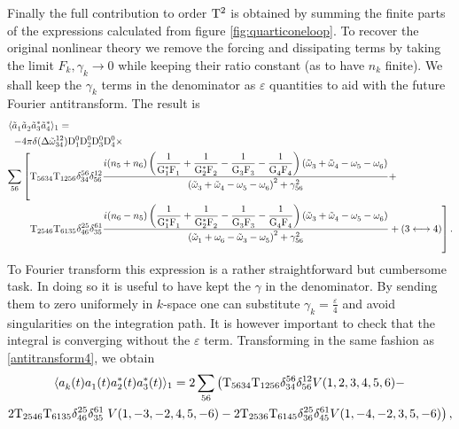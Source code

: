 Finally the full contribution to order $\mathrm{T}^2$ is obtained by summing the finite parts of the expressions calculated from figure \ref{fig:quarticoneloop}.
To recover the original nonlinear theory we remove the forcing and dissipating terms by taking the limit $F_k, \gamma_k \rightarrow 0$ while keeping their ratio constant
(as to have $n_k$ finite). We shall keep the $\gamma_k$ terms in the denominator as $\varepsilon$ quantities to aid with the future Fourier antitransform. The result is 
\begin{equation}
    \begin{aligned}
    \langle\tilde{a}_1^{} &\tilde{a}_2^{}\tilde{a}_3^{*}\tilde{a}_4^{*} \rangle_1 = 
    \\
    -&4\pi \delta(\Delta{\tilde{\omega}}^{12}_{34})\mathrm{D}^0_1\mathrm{D}^0_2\mathrm{D}^0_3\mathrm{D}^0_4 \times
    \\
      \sum_{56}&\left[\mathrm{T}_{5634}\mathrm{T}_{1256}\delta^{56}_{34}\delta^{12}_{56}
    \frac{i(n_5 + n_6)\left(\dfrac{1}{\mathrm{G}_1^*\mathrm{F}_1^{}}+\dfrac{1}{\mathrm{G}_2^*\mathrm{F}_2^{}}-\dfrac{1}{\mathrm{G}_3^{}\mathrm{F}_3^{}}
    -\dfrac{1}{\mathrm{G}_4^{}\mathrm{F}_4^{}}\right)\left( \tilde{\omega}^{}_3 + \tilde{\omega}^{}_4 - \omega^{}_5 - \omega^{}_6\right)}{\left( \tilde{\omega}^{}_3 + \tilde{\omega}^{}_4 - \omega^{}_5 - \omega^{}_6\right)^2 + \gamma^2_{56}}
    +  \right.
    \\
    &\hspace{2mm}\left. \mathrm{T}_{2546}\mathrm{T}_{6135}\delta^{25}_{46}\delta^{61}_{35}
    \frac{i(n_6 - n_5)\left(\dfrac{1}{\mathrm{G}_1^*\mathrm{F}_1^{}}+\dfrac{1}{\mathrm{G}_2^*\mathrm{F}_2^{}}-\dfrac{1}{\mathrm{G}_3^{}\mathrm{F}_3^{}}
    -\dfrac{1}{\mathrm{G}_4^{}\mathrm{F}_4^{}}\right)\left( \tilde{\omega}^{}_3 + \tilde{\omega}^{}_4 - \omega^{}_5 - \omega^{}_6\right)}{\left( \tilde{\omega}^{}_1 + \omega^{}_6 - \tilde{\omega}^{}_3 - \omega^{}_5\right)^2 + \gamma^2_{56}}
    + \left( 3 \longleftrightarrow 4 \right) \right].
    \end{aligned}
    \label{transformedfourpoint}
\end{equation}
To Fourier transform this expression is a rather straightforward but cumbersome task. In doing so it is useful to have kept the $\gamma$ in the denominator. 
By sending them to zero uniformely in $k$-space one can substitute $\gamma_k= \frac{\varepsilon}{4}$ and avoid singularities on the integration path. It is however important 
to check that the integral is converging without the $\varepsilon$ term. Transforming in the same fashion as \eqref{antitransform4}, we obtain 
\begin{multline}
    \langle a_k^{}(t) a_1^{}(t) a_2^*(t)a_3^*(t) \rangle_{1} = 2\sum_{56} \left( \mathrm{T}_{5634}\mathrm{T}_{1256}\delta^{56}_{34}\delta^{12}_{56}  V(1,2,3,4,5,6) - \right.\\
    2\mathrm{T}_{2546}\mathrm{T}_{6135}\delta^{25}_{46}\delta^{61}_{35}
    \left.V(1,-3,-2,4,5,-6) - 2\mathrm{T}_{2536}\mathrm{T}_{6145}\delta^{25}_{36}\delta^{61}_{45} V(1,-4,-2,3,5,-6)  \right),
    \label{finalfourpoint}
\end{multline}
